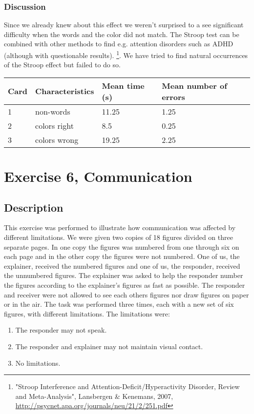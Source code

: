 \documentclass[10pt, a4paper]{article}
\begin{document}
\subsubsection{Discussion}
Since we already knew about this effect we weren't surprised to a see significant difficulty when the words and the color did not match. The Stroop test can be combined with other methods to find e.g. attention disorders such as ADHD (although with questionable results). \footnote{"Stroop Interference and Attention-Deficit/Hyperactivity Disorder, Review and Meta-Analysis", Lansbergen \& Kenemans, 2007, \url{http://psycnet.apa.org/journals/neu/21/2/251.pdf}}. We have tried to find natural occurrences of the Stroop effect but failed to do so.\\[5mm]

\begin{tabular}{l l l l}
  Card & Characteristics & Mean time (s) & Mean number of errors \\
  \hline
  1 & non-words & 11.25 & 1.25 \\
  2 & colors right & 8.5 & 0.25 \\
  3 & colors wrong & 19.25 & 2.25 \\
\end{tabular}

\section{Exercise 6, Communication}
\subsection{Description}
This exercise was performed to illustrate how communication was affected by different limitations. We were given two copies of 18 figures divided on three separate pages. In one copy the figures was numbered from one through six on each page and in the other copy the figures were not numbered. One of us, the explainer, received the numbered figures and one of us, the responder, received the unnumbered figures. The explainer was asked to help the responder number the figures according to the explainer's figures as fast as possible. The responder and receiver were not allowed to see each others figures nor draw figures on paper or in the air. The task was performed three times, each with a new set of six figures, with different limitations.
The limitations were:
\begin{enumerate}
\item The responder may not speak.
\item The responder and explainer may not maintain visual contact.
\item No limitations.
\end{enumerate}
\end{document}
